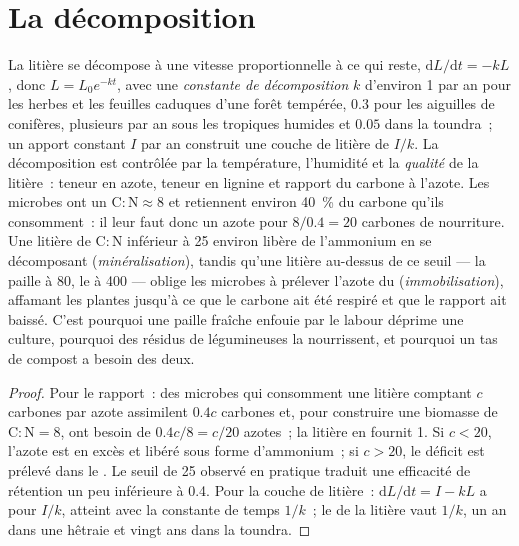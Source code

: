 \section{La décomposition}

\begin{theorem}\label{thm:b2:living-soil:decay}
La litière se décompose à une vitesse proportionnelle à ce qui reste,
$\mathrm{d}L/\mathrm{d}t = -kL$, donc $L = L_0 e^{-kt}$, avec une
\emph{constante de décomposition} $k$ d'environ 1 par an pour les herbes
et les feuilles caduques d'une forêt tempérée, $0.3$ pour les aiguilles
de conifères, plusieurs par an sous les tropiques humides et $0.05$ dans
la toundra~;
un apport constant $I$ par an construit une couche de litière de $I/k$. La
décomposition est contrôlée par la température, l'humidité et la
\emph{qualité} de la litière~: teneur en azote, teneur en lignine et
rapport du carbone à l'azote. Les microbes ont un $\mathrm{C:N} \approx 8$ et
retiennent environ \qty{40}{\%} du carbone qu'ils consomment~: il leur
faut donc un azote pour $8/0.4 = 20$ carbones de nourriture. Une litière de $\mathrm{C:N}$
inférieur à 25 environ libère de l'ammonium en se décomposant
(\emph{minéralisation}), tandis qu'une litière au-dessus de ce seuil ---
la paille à 80, le  à 400 --- oblige les microbes à prélever l'azote
du  (\emph{immobilisation}), affamant les plantes jusqu'à ce que le
carbone ait été respiré et que le rapport ait baissé. C'est pourquoi une
paille fraîche enfouie par le labour déprime une culture, pourquoi des
résidus de légumineuses la nourrissent, et pourquoi un tas de compost a
besoin des deux.
\end{theorem}
\begin{proof}
Pour le rapport~: des microbes qui consomment une litière comptant $c$
carbones par azote assimilent $0.4c$ carbones et, pour construire une
biomasse de
$\mathrm{C:N} = 8$, ont besoin de $0.4c/8 = c/20$ azotes~; la litière en
fournit 1. Si $c < 20$, l'azote est en excès et libéré sous forme
d'ammonium~; si $c > 20$, le déficit est prélevé dans le . Le seuil de
25 observé en pratique traduit une efficacité de rétention un peu
inférieure à 0.4. Pour la couche de litière~: $\mathrm{d}L/\mathrm{d}t = I - kL$
a pour  $I/k$, atteint avec la constante de temps
$1/k$~; le  de la litière vaut $1/k$, un an dans une
hêtraie et vingt ans dans la toundra.
\end{proof}

